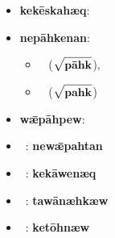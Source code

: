 \begin{assgts}
\item \begin{itemize}
\item \textbf{kekēskahæq}: \yumi\ \kekEskaeq {\mezah}
\item \textbf{nepāhkenan}:
\begin{itemize}
\item \mi\ \nepAhkarn {\mezen} ($\sqrt{\mbox{\tallstrut \textbf{pāhk}}}$),
\item \mi\ \nepAhkaln {\mezen} ($\sqrt{\mbox{\tallstrut \textbf{pahk}}}$)
\end{itemize}
\item \textbf{wǣpāhpew}: \ta\ \wAEpAhpew
\end{itemize}
\item \begin{itemize}\setlength{\itemsep}{0pt}
\item \mi\ \newAEpahtan: \textbf{newǣpahtan}
\item \yumi\ \kekAwaeq {\mezen}: \textbf{kekāwenæq}
\item \ta\ \tawAnaehkaew: \textbf{tawānæhkæw}
\item \ta\ \ketOhnaew: \textbf{ketōhnæw}
\end{itemize}
\end{assgts}

